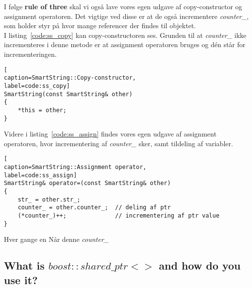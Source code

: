 I følge \textbf{rule of three} skal vi også lave vores egen udgave af copy-constructor og assignment operatoren.
Det vigtige ved disse er at de også incrementere \textit{counter\_}, som holder styr på hvor mange referencer der findes til objektet.\\

I listing~\ref{code:ss_copy} kan copy-constructoren ses. Grunden til at \textit{counter\_} ikke incrementeres i denne metode er at assignment operatoren bruges og dén står for incrementeringen. 

\begin{lstlisting}[
caption=SmartString::Copy-constructor, 
label=code:ss_copy]
SmartString(const SmartString& other)
{
	*this = other;
}
\end{lstlisting}

Videre i listing~\ref{code:ss_assign} findes vores egen udgave af assignment operatoren, hvor incrementering af \textit{counter\_} sker, samt tildeling af variabler.

\begin{lstlisting}[
caption=SmartString::Assignment operator,
label=code:ss_assign]
SmartString& operator=(const SmartString& other)
{
	str_ = other.str_;
	counter_ = other.counter_;	// deling af ptr
	(*counter_)++;				// incrementering af ptr value
}
\end{lstlisting}

Hver gange en 
Når denne \textit{counter\_} 

\subsection{What is $boost::shared\_ptr<>$ and how do you use it?}
